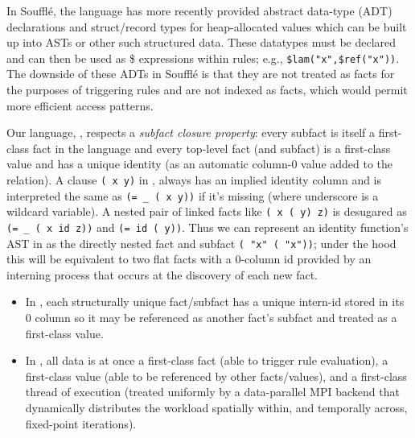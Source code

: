 In Souffl\'e, the language has more recently provided abstract data-type (ADT) declarations and struct/record types for heap-allocated values which can be built up into ASTs
or other such structured data. These datatypes must be declared and can then be used as \$ expressions within rules; e.g., \texttt{\$lam("x",\$ref("x"))}.
The downside of these ADTs in Souffl\'e is that they are not treated as facts for the purposes of triggering rules and are
not indexed as facts, which would permit more efficient access patterns.

Our language, \slog{}, respects a \emph{subfact closure property}: every subfact is itself a first-class fact in the language and every top-level fact (and subfact) is a first-class value and has a unique identity (as an automatic column-$0$ value added to the relation). A clause \texttt{( x y)} in \slog{}, always has an implied identity column and is interpreted the same as \texttt{(= \_ ( x y))} if it's missing (where underscore is a wildcard variable). A nested pair of linked facts like \texttt{( x ( y) z)} is desugared as \texttt{(= \_ ( x id z))} and \texttt{(= id ( y))}. Thus we can represent an identity function's AST in \slog{} as the directly nested fact and subfact \texttt{( "x" ( "x"))}; under the hood this will be equivalent to two flat facts with a 0-column id provided by an interning process that occurs at the discovery of each new \slog{} fact.

\begin{itemize}
\item In \slog{}, each structurally unique fact/subfact has a unique intern-id stored in its 0 column so it may be referenced as another fact's subfact and treated as a first-class value.
\item In \slog{}, all data is at once a first-class fact (able to trigger rule evaluation), a first-class value (able to be referenced by other facts/values), and a first-class thread of execution (treated uniformly by a data-parallel MPI backend that dynamically distributes the workload spatially within, and temporally across, fixed-point iterations).
\end{itemize}

